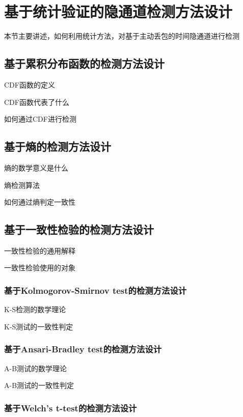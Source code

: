 \section{基于统计验证的隐通道检测方法设计}
\label{chap:analyze:statistical}

本节主要讲述，如何利用统计方法，对基于主动丢包的时间隐通道进行检测

\subsection{基于累积分布函数的检测方法设计}
\label{chap:analyze:statistical:cdf}

CDF函数的定义

CDF函数代表了什么

如何通过CDF进行检测

\subsection{基于熵的检测方法设计}
\label{chap:analyze:statistical:entropy}

熵的数学意义是什么

熵检测算法

如何通过熵判定一致性

\subsection{基于一致性检验的检测方法设计}
\label{chap:analyze:statistical:test}

一致性检验的通用解释

一致性检验使用的对象

\subsubsection{基于Kolmogorov-Smirnov test的检测方法设计}
\label{chap:analyze:statistical:test:ks}

K-S检测的数学理论

K-S测试的一致性判定

\subsubsection{基于Ansari-Bradley test的检测方法设计}
\label{chap:analyze:statistical:test:an}

A-B测试的数学理论

A-B测试的一致性判定

\subsubsection{基于Welch’s t-test的检测方法设计}
\label{chap:analyze:statistical:test:t}

